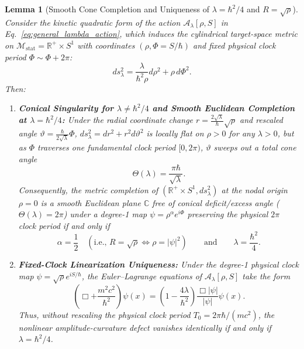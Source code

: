 \documentclass[11pt, a4paper]{article}
\newtheorem{lemma}[theorem]{Lemma}
\theoremstyle{definition}
\begin{document}
\begin{lemma}[Smooth Cone Completion and Uniqueness of $\lambda = \hbar^2/4$ and $R = \sqrt{\rho}$]
\label{lem:uniqueness}
Consider the kinetic quadratic form of the action $\mathcal{A}_\lambda[\rho, S]$ in Eq.~\eqref{eq:general_lambda_action}, which induces the cylindrical target-space metric on $\mathcal{M}_{\text{stat}} = \mathbb{R}^+ \times S^1$ with coordinates $(\rho, \Phi = S/\hbar)$ and fixed physical clock period $\Phi \sim \Phi + 2\pi$:
\begin{equation}
\label{eq:lambda_metric}
ds^2_\lambda = \frac{\lambda}{\hbar^2 \rho} d\rho^2 + \rho \, d\Phi^2.
\end{equation}
Then:
\begin{enumerate}[label=(\roman*)]
    \item \textbf{Conical Singularity for $\lambda \neq \hbar^2/4$ and Smooth Euclidean Completion at $\lambda = \hbar^2/4$:} Under the radial coordinate change $r = \frac{2\sqrt{\lambda}}{\hbar}\sqrt{\rho}$ and rescaled angle $\vartheta = \frac{\hbar}{2\sqrt{\lambda}}\Phi$, $ds^2_\lambda = dr^2 + r^2 d\vartheta^2$ is locally flat on $\rho > 0$ for any $\lambda > 0$, but as $\Phi$ traverses one fundamental clock period $[0, 2\pi)$, $\vartheta$ sweeps out a total cone angle
    \begin{equation}
    \label{eq:cone_angle}
    \Theta(\lambda) = \frac{\pi \hbar}{\sqrt{\lambda}}.
    \end{equation}
    Consequently, the metric completion of $(\mathbb{R}^+ \times S^1, ds^2_\lambda)$ at the nodal origin $\rho = 0$ is a smooth Euclidean plane $\mathbb{C}$ free of conical deficit/excess angle ($\Theta(\lambda) = 2\pi$) under a degree-1 map $\psi = \rho^\alpha e^{i\Phi}$ preserving the physical $2\pi$ clock period \cite{Reginatto1999, Khesin2018} if and only if
    \begin{equation}
    \label{eq:unique_params}
    \alpha = \frac{1}{2} \quad \left(\text{i.e., } R = \sqrt{\rho} \iff \rho = |\psi|^2\right) \qquad \text{and} \qquad \lambda = \frac{\hbar^2}{4}.
    \end{equation}
    \item \textbf{Fixed-Clock Linearization Uniqueness:} Under the degree-1 physical clock map $\psi = \sqrt{\rho}e^{iS/\hbar}$, the Euler--Lagrange equations of $\mathcal{A}_\lambda[\rho, S]$ take the form
    \begin{equation}
    \label{eq:nonlinear_defect}
    \left( \Box + \frac{m^2 c^2}{\hbar^2} \right) \psi(x) = \left( 1 - \frac{4\lambda}{\hbar^2} \right) \frac{\Box |\psi|}{|\psi|} \psi(x).
    \end{equation}
    Thus, without rescaling the physical clock period $T_0 = 2\pi\hbar/(mc^2)$, the nonlinear amplitude-curvature defect vanishes identically if and only if $\lambda = \hbar^2/4$.
\end{enumerate}
\end{lemma}
\end{document}
